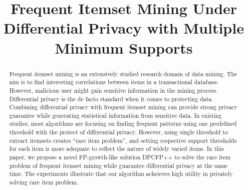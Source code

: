 \documentclass[conference]{IEEEtran}
\begin{document}
\newtheorem{definition}{Definition}
\theoremstyle{definition}

\title{Frequent Itemset Mining Under Differential Privacy with Multiple Minimum Supports}

\author{
\and
{}
\and
{}
}

\maketitle

\begin{abstract}
Frequent itemset mining is an extensively studied research domain of data mining. The aim is to find interesting correlations between items in a transactional database. 
However, malicious user might gain sensitive information in the mining process. 
Differential privacy is the de facto standard when it comes to protecting data. 
Combining differential privacy with frequent itemset mining can provide strong privacy guarantee while generating statistical information from sensitive data.
In existing studies, most algorithms are focusing on finding frequent patterns using one predefined threshold with the protect of differential privacy.
However, using single threshold to extract itemsets creates ``rare item problem'', and setting respective support thresholds for each item is more adequate to reflect the nature of widely varied items.
In this paper, we propose a novel FP-growth-like solution DPCFP++ to solve the rare item problem of frequent itemset mining while guarantee differential privacy at the same time.
The experiments illustrate that our algorithm acheieves high utility in privately solving rare item problem.
\end{abstract}
\end{document}
